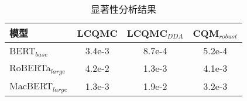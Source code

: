\begin{table}[h]
    \caption{显著性分析结果}
    \centering
    \newcommand{\tabincell}[2]{\begin{tabular}{@{}#1@{}}#2\end{tabular}}
    \begin{tabular}{l|c|c|c}
    \toprule[0.7pt]
    \textbf{模型} & \enspace\textbf{LCQMC}\enspace & \enspace\textbf{LCQMC$_{DDA}$}\enspace & \enspace\textbf{CQM$_{robust}$} \\
    \midrule[0.7pt]

    BERT$_{base}$   & 3.4e-3 & 8.7e-4 & \enspace 5.2e-4 \\
    RoBERTa$_{large}$ & 4.2e-2 & 1.3e-3 & \enspace 4.1e-3 \\
    MacBERT$_{large}$\quad\quad & 1.3e-3 & 1.9e-2 & \enspace 3.2e-3 \\

    \bottomrule[0.7pt]
    \end{tabular}
    \label{table4-8}
\end{table}